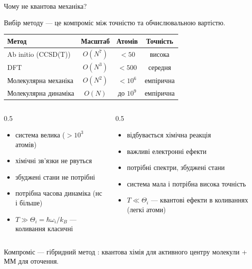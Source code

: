 \documentclass[]{beamer}
\begin{document}
\begin{frame}{Чому не квантова механіка?}\small
	\begin{alertblock}{}\centering
		Вибір методу — це компроміс між точністю та обчислювальною вартістю.
	\end{alertblock}
	\begin{center}\scriptsize
		\begin{tabular}{lccc}
			\toprule
			\textbf{Метод} & \textbf{Масштаб} & \textbf{Атомів} & \textbf{Точність} \\
			\midrule
			Ab initio (CCSD(T)) & $O(N^7)$ & $<50$        & висока \\
			DFT                 & $O(N^3)$ & $<500$       & середня \\
			Молекулярна механіка & $O(N^2)$ & $<10^6$     & емпірична \\
			Молекулярна динаміка & $O(N)$   & до $10^9$   & емпірична \\
			\bottomrule
		\end{tabular}
	\end{center}
	\begin{columns}[t]\scriptsize
		\begin{column}{0.5\linewidth}
			\begin{itemize}
				\item система велика ($>10^3$ атомів)
				\item хімічні зв'язки не рвуться
				\item збуджені стани не потрібні
				\item потрібна часова динаміка (нс і більше)
				\item $T \gg \Theta_i = \hbar\omega_i/k_B$ --- коливання класичні
			\end{itemize}
		\end{column}
		\begin{column}{0.5\linewidth}
			\begin{itemize}
				\item відбувається хімічна реакція
				\item важливі електронні ефекти
				\item потрібні спектри, збуджені стани
				\item система мала і потрібна висока точність
				\item $T \ll \Theta_i$ --- квантові ефекти в коливаннях (легкі атоми)
			\end{itemize}
		\end{column}
	\end{columns}
	\begin{block}{}\small\centering
		Компроміс --- гібридний метод : квантова хімія для активного центру молекули + ММ для оточення.
	\end{block}
\end{frame}
\end{document}
